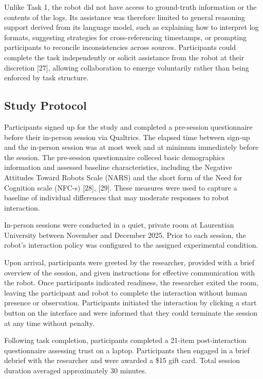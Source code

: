 \documentclass[
  letterpaper,
  DIV=11,
  numbers=noendperiod]{scrartcl}
\begin{document}
Unlike Task 1, the robot did not have access to ground-truth information
or the contents of the logs. Its assistance was therefore limited to
general reasoning support derived from its language model, such as
explaining how to interpret log formats, suggesting strategies for
cross-referencing timestamps, or prompting participants to reconcile
inconsistencies across sources. Participants could complete the task
independently or solicit assistance from the robot at their discretion
{[}27{]}, allowing collaboration to emerge voluntarily rather than being
enforced by task structure.

\subsection{Study Protocol}\label{study-protocol}

Participants signed up for the study and completed a pre-session
questionnaire before their in-person session via Qualtrics. The elapsed
time between sign-up and the in-person session was at most week and at
minimum immediately before the session. The pre-session questionnaire
colleced basic demographics information and assessed baseline
characteristics, including the Negative Attitudes Toward Robots Scale
(NARS) and the short form of the Need for Cognition scale (NFC-s)
{[}28{]}, {[}29{]}. These measures were used to capture a baseline of
individual differences that may moderate responses to robot interaction.

In-person sessions were conducted in a quiet, private room at Laurentian
University between November and December 2025. Prior to each session,
the robot's interaction policy was configured to the assigned
experimental condition.

Upon arrival, participants were greeted by the researcher, provided with
a brief overview of the session, and given instructions for effective
communication with the robot. Once participants indicated readiness, the
researcher exited the room, leaving the participant and robot to
complete the interaction without human presence or observation.
Participants initiated the interaction by clicking a start button on the
interface and were informed that they could terminate the session at any
time without penalty.

Following task completion, participants completed a 21-item
post-interaction questionnaire assessing trust on a laptop. Participants
then engaged in a brief debrief with the researcher and were awarded a
\$15 gift card. Total session duration averaged approximately 30
minutes.
\end{document}
